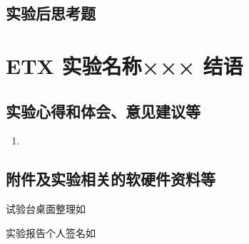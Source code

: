 \documentclass[dvipsnames, svgnames,a4paper,11pt]{article}
\begin{document}
	
	\subsection{实验后思考题}
	
	\begin{question}
		
	\end{question}
	
	\begin{question}
		
	\end{question}
	
	\begin{question}
		
	\end{question}
	
	
	
	\clearpage
	
	\section{ETX 实验名称××× \quad\heiti 结语}
	
	\subsection{实验心得和体会、意见建议等}
	\begin{enumerate}
		\item 
	\end{enumerate}
	

	\subsection{附件及实验相关的软硬件资料等}
	试验台桌面整理如%
	
	实验报告个人签名如

	
	
\end{document}
